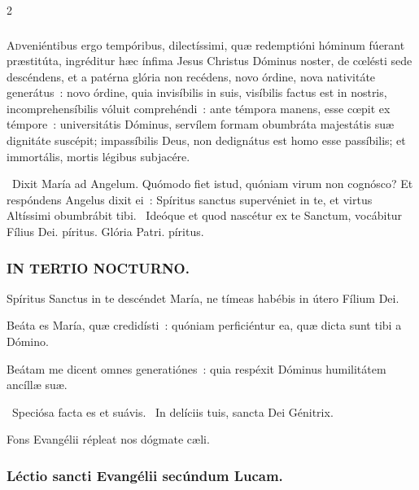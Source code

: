 \documentclass[9pt,twoside]{extarticle}
\begin{document}
\begin{multicols}{2}
{{\subsubsection*{\center {}}
\lettrine{A}dveniéntibus ergo tempóribus, dilectíssimi, quæ redemptióni hóminum fúerant præstitúta, ingréditur hæc ínfima Jesus Christus Dóminus noster, de cœlésti sede descéndens, et a patérna glória non recédens, novo órdine, nova nativitáte generátus~: novo órdine, quia invisíbilis in suis, visíbilis factus est in nostris, incomprehensíbilis vóluit comprehéndi~: ante témpora manens, esse cœpit ex témpore~: universitátis Dóminus, servílem formam obumbráta majestátis suæ dignitáte suscépit; impassíbilis Deus, non dedignátus est homo esse passíbilis; et immortális, mortis légibus subjacére.

\begin{tightlist}{}
\item {}~Dixit María ad Angelum. Quómodo fiet istud, quóniam virum non cognósco? Et respóndens Angelus dixit ei~: \textred{*} Spíritus sanctus supervéniet in te, et virtus Altíssimi obumbrábit tibi. ~Ideóque et quod nascétur ex te Sanctum, vocábitur Fílius Dei. píritus. Glória Patri. píritus.
\end{tightlist}

\subsubsection*{\center \textsc{IN TERTIO NOCTURNO.}}
\begin{tightlist}{}
\item {} Spíritus Sanctus in te descéndet María, ne tímeas habébis in útero Fílium Dei.
\item {} Beáta es María, quæ credidísti~: quóniam perficiéntur ea, quæ dicta sunt tibi a Dómino.
\item {} Beátam me dicent omnes generatiónes~: quia respéxit Dóminus humilitátem ancíllæ suæ.
\item {}~Speciósa facta es et suávis. ~In delíciis tuis, sancta Dei Génitrix.
\item {\small {} Fons Evangélii répleat nos dógmate cæli.}
\end{tightlist}

\subsubsection*{\center Léctio sancti Evangélii secúndum Lucam.}
}}
\end{multicols}
\end{document}

